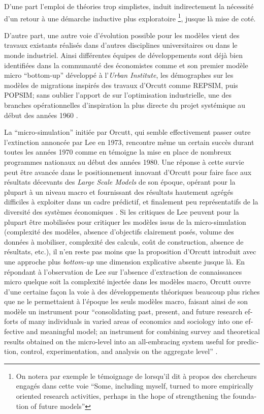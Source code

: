 D'une part l'emploi de théories trop simplistes, induit indirectement la nécessité d'un retour à une démarche inductive plus exploratoire \footnote{On notera par exemple le témoignage de \textcite{Boyce1988} lorsqu'il dit à propos des chercheurs engagés dans cette voie \foreignquote{english}{Some, including myself, turned to more empirically oriented research activities, perhaps in the hope of strengthening the foundation of future models}}, jusque là mise de coté. 

D'autre part, une autre voie d'évolution possible pour les modèles vient des travaux existants réalisés dans d'autres disciplines universitaires ou dans le monde industriel. Ainsi différentes équipes de développements sont déjà bien identifiées dans la communauté des économistes comme \textcite{Orcutt1960} et son premier modèle micro \foreignquote{english}{bottom-up} développé à l'\textit{Urban Institute}, les démographes sur les modèles de migrations inspirés des travaux d'Orcutt comme REPSIM, puis POPSIM; sans oublier l'apport de \textcite{Forrester1961} sur l'optimisation industrielle, une des branches opérationnelles d'inspiration la plus directe du projet systémique au début des années 1960 \autocites{Cohen1961}[911]{Shubik1960b}.

La \enquote{micro-simulation} initiée par Orcutt, qui semble effectivement passer outre l'extinction annoncée par Lee en 1973, rencontre même un certain succès durant toutes les années 1970 comme en témoigne la mise en place de nombreux programmes nationaux au début des années 1980. \autocite{Baroni2007} Une réponse à cette survie peut être avancée dans le positionnement innovant d'Orcutt pour faire face aux résultats décevants des \textit{Large Scale Models} de son époque, opérant pour la plupart à un niveau macro et fournissant des résultats hautement agrégés difficiles à exploiter dans un cadre prédictif, et finalement peu représentatifs de la diversité des systèmes économiques \autocites{Birkin2012, Baroni2007}. Si les critiques de Lee peuvent pour la plupart être mobilisées pour critiquer les modèles issus de la micro-simulation (complexité des modèles, absence d'objectifs clairement posés, volume des données à mobiliser, complexité des calculs, coût de construction, absence de résultats, etc.), il n'en reste pas moins que la proposition d'Orcutt introduit avec une approche plus \textit{bottom-up} une dimension explicative absente jusque là. En répondant à l'observation de Lee sur l'absence d'extraction de connaissances micro quelque soit la complexité injectée dans les modèles macro, Orcutt ouvre d'une certaine façon la voie à des développements théoriques beaucoup plus riches que ne le permettaient à l'époque les seuls modèles macro, faisant ainsi de son modèle un instrument pour \foreignquote{english}{consolidating past, present, and future research efforts of many individuals in varied areas of economics and sociology into one effective and meaningful model; an instrument for combining survey and theoretical results obtained on the micro-level into an all-embracing system useful for prediction, control, experimentation, and analysis on the aggregate level} \autocite[122]{Cohen1961}.

